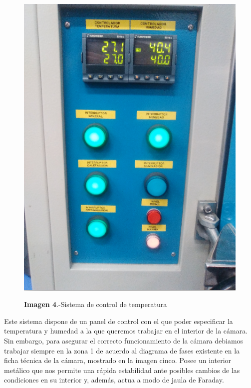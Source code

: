 \begin{itemize}
\begin{figure}[htb]
{\includegraphics[scale=0.15]{PanelTemperatura.png} 
}
\caption{\textbf{Imagen 4}.-Sistema de control de temperatura}
\end{figure}

Este sistema dispone de un panel de control con el que poder especificar la temperatura y humedad a la que queremos trabajar en el interior de la cámara. Sin embargo, para asegurar el correcto funcionamiento de la cámara debiamos trabajar siempre en la zona 1 de acuerdo al diagrama de fases existente en la ficha técnica de la cámara, mostrado en la imagen cinco. Posee un interior metálico que nos permite una rápida estabilidad ante posibles cambios de las condiciones en su interior y, además, actua a modo de jaula de Faraday. 


\end{itemize}
